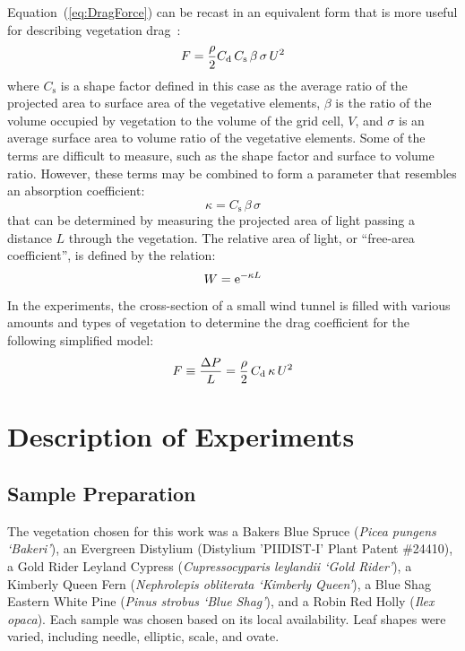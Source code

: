 \documentclass[12pt]{article}
\begin{document}
Equation~(\ref{eq:DragForce}) can be recast in an equivalent form that is more useful for describing vegetation drag~\cite{Mueller2014}:
\begin{equation}
\label{eq:DragForcea}
F  = \frac{\rho}{2} C_{\rm d} \, C_{\mathrm{s}} \, \beta \, \sigma \, U^2
\end{equation}
where $C_{\mathrm{s}}$ is a shape factor defined in this case as the average ratio of the projected area to surface area of the vegetative elements, $\beta$ is the ratio of the volume occupied by vegetation to the volume of the grid cell, $V$, and $\sigma$ is an average surface area to volume ratio of the vegetative elements. Some of the terms are difficult to measure, such as the shape factor and surface to volume ratio. However, these terms may be combined to form a parameter that resembles an absorption coefficient:
\begin{equation}
\label{eq:Kappa}
\kappa = C_{\mathrm{s}} \, \beta \, \sigma
\end{equation}
that can be determined by measuring the projected area of light passing a distance $L$ through the vegetation. The relative area of light, or ``free-area coefficient'', is defined by the relation:
\begin{equation}\label{eq:WhiteFraction}
W = {\rm e}^{-\kappa L}
\end{equation}
In the experiments, the cross-section of a small wind tunnel is filled with various amounts and types of vegetation to determine the drag coefficient for the following simplified model:
\begin{equation}\label{eq:Pressure}
F \equiv \frac{\Delta P}{L}  = \frac{\rho}{2} \, C_{\rm d} \, \kappa \, U^2
\end{equation}



\section{Description of Experiments}
\label{sec:Experiments}


\subsection{Sample Preparation}
\label{ssec:headingscap}

The vegetation chosen for this work was a Bakers Blue Spruce ({\em Picea pungens `Bakeri'}), an Evergreen Distylium (Distylium 'PIIDIST-I' Plant Patent \#24410), a Gold Rider Leyland Cypress ({\em Cupressocyparis leylandii `Gold Rider'}), a Kimberly Queen Fern ({\em Nephrolepis obliterata `Kimberly Queen'}), a Blue Shag Eastern White Pine ({\em Pinus strobus `Blue Shag'}), and a Robin Red Holly ({\em Ilex opaca}). Each sample was chosen based on its local availability. Leaf shapes were varied, including needle, elliptic, scale, and ovate.
\end{document}
